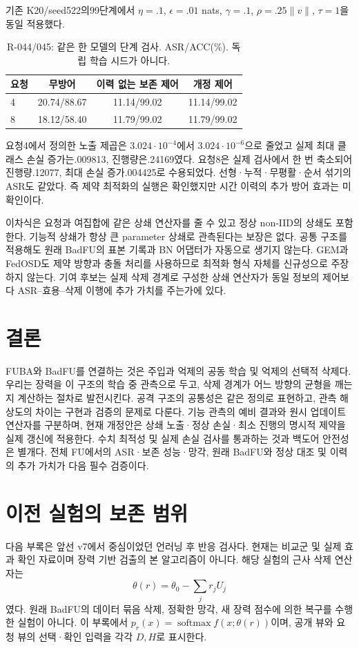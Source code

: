\documentclass[10pt,a4paper]{article}
\begin{document}
기존 K20/seed522의99단계에서 $\eta=.1$, $\epsilon=.01$ nats,
$\gamma=.1$, $\rho=.25\|v\|$, $\tau=1$을 동일 적용했다.
\begin{table}[ht]\centering\small
\caption{R-044/045: 같은 한 모델의 단계 검사. ASR/ACC(\%). 독립 학습 시드가 아니다.}
\begin{tabular}{lccc}\toprule
요청 & 무방어 & 이력 없는 보존 제어 & 개정 제어\\\midrule
4 &20.74/88.67&11.14/99.02&11.14/99.02\\
8 &18.12/58.40&11.79/99.02&11.79/99.02\\\bottomrule
\end{tabular}
\end{table}
요청4에서 정의한 노출 제곱은 $3.024\cdot10^{-4}$에서
$3.024\cdot10^{-6}$으로 줄었고 실제 최대 클래스 손실 증가는.009813,
진행량은.24169였다. 요청8은 실제 검사에서 한 번 축소되어 진행량.12077,
최대 손실 증가.004425로 수용되었다. 선형·누적·무평활·순서 섞기의 ASR도 같았다.
즉 제약 최적화의 실행은 확인했지만 시간 이력의 추가 방어 효과는 미확인이다.

이차식은 요청과 여집합에 같은 상쇄 연산자를 줄 수 있고 정상 non-IID의 상쇄도
포함한다. 기능적 상쇄가 항상 큰 parameter 상쇄로 관측된다는 보장은 없다.
공통 구조를 적용해도 원래 BadFU의 표본 기록과 BN 어댑터가 자동으로 생기지 않는다.
GEM과 FedOSD도 제약 방향과 충돌 처리를 사용하므로
최적화 형식 자체를 신규성으로 주장하지 않는다\cite{gem,fedosd}.
기여 후보는 실제 삭제 경계로 구성한 상쇄 연산자가 동일 정보의 제어보다
ASR--효용--삭제 이행에 추가 가치를 주는가에 있다.

\section{결론}
FUBA와 BadFU를 연결하는 것은 주입과 억제의 공동 학습 및 억제의 선택적 삭제다.
우리는 장력을 이 구조의 학습 중 관측으로 두고,
삭제 경계가 어느 방향의 균형을 깨는지 계산하는 절차로 발전시킨다.
공격 구조의 공통성은 같은 정의로 표현하고, 관측 해상도의 차이는 구현과 검증의 문제로 다룬다.
기능 관측의 예비 결과와 원시 업데이트 연산자를 구분하며,
현재 개정안은 상쇄 노출·정상 손실·최소 진행의 명시적 제약을 실제 갱신에 적용한다.
수치 최적성 및 실제 손실 검사를 통과하는 것과 백도어 안전성은 별개다.
전체 FU에서의 ASR·보존 성능·망각, 원래 BadFU와 정상 대조 및 이력의 추가 가치가 다음 필수 검증이다.

\appendix
\section{이전 실험의 보존 범위}
다음 부록은 앞선 v7에서 중심이었던 언러닝 후 반응 검사다.
현재는 비교군 및 실제 효과 확인 자료이며 장력 기반 검출의 본 알고리즘이 아니다.
해당 실험의 근사 삭제 연산자는
\begin{equation}\label{eq:proxy}
 \theta(r)=\theta_0-\sum_jr_jU_j
\end{equation}
였다. 원래 BadFU의 데이터 묶음 삭제, 정확한 망각, 새 장력 점수에 의한 복구를 수행한 실험이 아니다.
이 부록에서 $p_r(x)=\operatorname{softmax}f(x;\theta(r))$이며,
공개 뷰와 요청 뷰의 선택·확인 입력을 각각 $D,H$로 표시한다.
\end{document}
